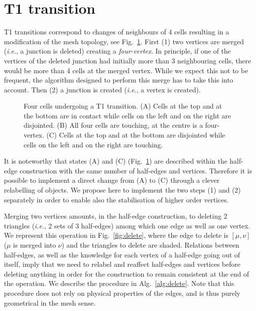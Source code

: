 \documentclass[aps, superscriptaddress, notitlepage]{revtex4-1}
\begin{document}
\section{T1 transition}

T1 transitions correspond to changes of neighbours of 4 cells resulting in a modification of the mesh topology, see Fig.~\ref{fig:t1}. First (1) two vertices are merged (\textit{i.e.}, a junction is deleted) creating a \textit{four-vertex}. In principle, if one of the vertices of the deleted junction had initially more than 3 neighbouring cells, there would be more than 4 cells at the merged vertex. While we expect this not to be frequent, the algorithm designed to perform this merge has to take this into account. Then (2) a junction is created (\textit{i.e.}, a vertex is created).

\begin{figure}[!b]
\centering
\begin{tikzpicture}[scale=0.25*\scale]

\end{tikzpicture}
\caption{Four cells undergoing a T1 transition. (A) Cells at the top and at the bottom are in contact while cells on the left and on the right are disjointed. (B) All four cells are touching, at the centre is a four-vertex. (C) Cells at the top and at the bottom are disjointed while cells on the left and on the right are touching.}
\label{fig:t1}
\end{figure}

It is noteworthy that states (A) and (C) (Fig.~\ref{fig:t1}) are described within the half-edge construction with the same number of half-edges and vertices. Therefore it is possible to implement a direct change from (A) to (C) through a clever relabelling of objects. We propose here to implement the two steps (1) and (2) separately in order to enable also the stabilisation of higher order vertices.

Merging two vertices amounts, in the half-edge construction, to deleting 2 triangles (\textit{i.e.}, 2 sets of 3 half-edges) among which one edge as well as one vertex. We represent this operation in Fig.~\ref{fig:delete}, where the edge to delete is $[\mu, \nu]$ ($\mu$ is merged into $\nu$) and the triangles to delete are shaded. Relations between half-edges, as well as the knowledge for each vertex of a half-edge going out of itself, imply that we need to relabel and reaffect half-edges and vertices before deleting anything in order for the construction to remain consistent at the end of the operation. We describe the procedure in Alg.~\ref{alg:delete}. Note that this procedure does not rely on physical properties of the edges, and is thus purely geometrical in the mesh sense.
\end{document}
